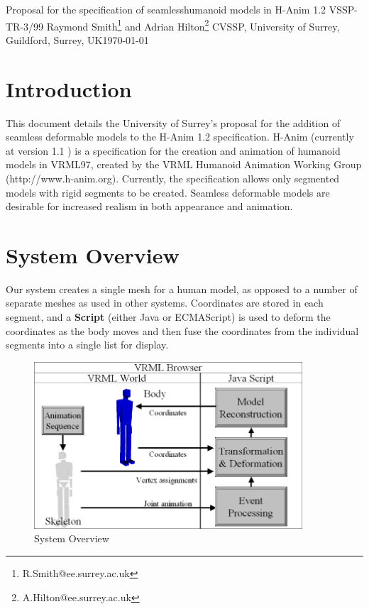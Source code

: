 \documentclass[12pt,oneside,a4paper,titlepage]{article}
\begin{document}
\begin{titlepage}
\addtolength{\topmargin}{1cm}
\begin{center}
\Large Proposal for the specification of seamless\linebreak humanoid models in H-Anim 1.2\medskip\linebreak
\large VSSP-TR-3/99\bigskip\linebreak
\normalsize Raymond Smith\footnote{R.Smith@ee.surrey.ac.uk} and Adrian Hilton\footnote{A.Hilton@ee.surrey.ac.uk}\medskip\linebreak
\small CVSSP, University of Surrey,\linebreak
Guildford, Surrey, UK\medskip\linebreak\today
\end{center}
\end{titlepage}

\section{\label{sec:intro}Introduction}
This document details the University of Surrey's proposal for the addition of seamless deformable models to the H-Anim 1.2 specification. H-Anim (currently at version 1.1 \cite{HANIM:1.1}) is a specification for the creation and animation of humanoid models in VRML97\cite{W3DC:VRML97}, created by the VRML Humanoid Animation Working Group (http://www.h-anim.org). Currently, the specification allows only segmented models with rigid segments to be created. Seamless deformable models are desirable for increased realism in both appearance and animation.

\section{\label{sec:overview}System Overview}
Our system creates a single mesh for a human model, as opposed to a number of separate meshes as used in other systems. Coordinates are stored in each segment, and a {\bf Script} (either Java or ECMAScript) is used to deform the coordinates as the body moves and then fuse the coordinates from the individual segments into a single list for display.

\begin{figure}[hbp]
\begin{center}
\includegraphics[width=10cm]{../images/systemdiagram2}
\caption{\label{fig:overview} System Overview}
\end{center}
\end{figure}
\end{document}

